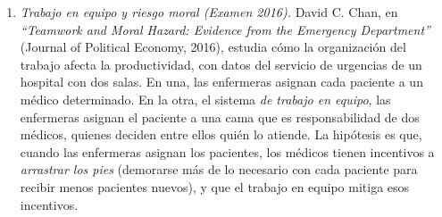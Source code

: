 \documentclass[letterpaper,11pt]{article}
\begin{document}
\begin{enumerate}[itemsep=0.8em]
\item \emph{Trabajo en equipo y riesgo moral (Examen 2016).} David C. Chan, en
    \textit{``Teamwork and Moral Hazard: Evidence from the Emergency Department''} (Journal
    of Political Economy, 2016), estudia cómo la organización del trabajo afecta la
    productividad, con datos del servicio de urgencias de un hospital con dos salas. En una, las
    enfermeras asignan cada paciente a un médico determinado. En la otra, el sistema \emph{de
    trabajo en equipo}, las enfermeras asignan el paciente a una cama que es responsabilidad de
    dos médicos, quienes deciden entre ellos quién lo atiende. La hipótesis es que, cuando las
    enfermeras asignan los pacientes, los médicos tienen incentivos a \emph{arrastrar los pies}
    (demorarse más de lo necesario con cada paciente para recibir menos pacientes nuevos), y que
    el trabajo en equipo mitiga esos incentivos.


\end{enumerate}
\end{document}
